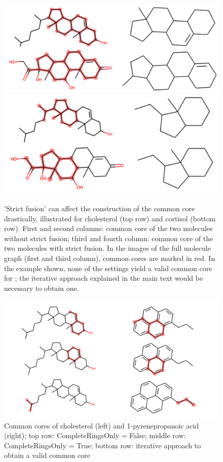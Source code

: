 \begin{figure}
\includegraphics[scale=0.45]{sterols_wo_strictfusion}\includegraphics[scale=0.4]{sterols_w_strictfusion}

\caption{'Strict fusion' can affect the construction of the common core drastically, illustrated for cholesterol (top row) and cortisol (bottom row). First and second columns: common core of the two molecules without strict fusion; third and fourth column: common
core of the two molecules with strict fusion. In the images of the full molecule graph (first and third column), common cores are marked in red. In the example shown, none of the settings yield a valid common core for \trafo; the iterative approach explained in the main text would be necessary to obtain one. }

\end{figure}




\begin{figure}
	\includegraphics[scale=0.6]{cholesterol_pryenepropanoic_acid.png}
	
	\caption{Common cores of cholesterol (left) and 1-pyrenepropanoic acid (right); top row: CompleteRingsOnly = False; middle row: CompleteRingsOnly = True; bottom row: iterative approach to obtain a valid {\trafo} common core}
	\label{fig:pyrene}
\end{figure}

